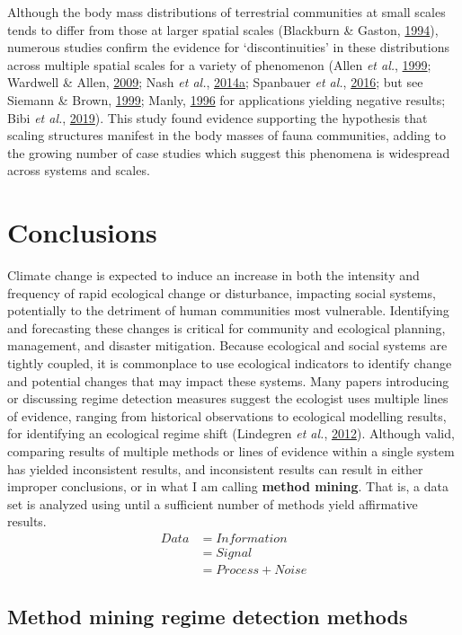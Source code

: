 \documentclass[12pt,twoside,openany]{reedthesis}
\begin{document}
Although the body mass distributions of terrestrial communities at small scales tends to differ from those at larger spatial scales (Blackburn \& Gaston, \protect\hyperlink{ref-blackburn1994animal}{1994}), numerous studies confirm the evidence for `discontinuities' in these distributions across multiple spatial scales for a variety of phenomenon (Allen \emph{et al.}, \protect\hyperlink{ref-allen1999body}{1999}; Wardwell \& Allen, \protect\hyperlink{ref-wardwell2009variability}{2009}; Nash \emph{et al.}, \protect\hyperlink{ref-nash2014discontinuities}{2014}\protect\hyperlink{ref-nash2014discontinuities}{a}; Spanbauer \emph{et al.}, \protect\hyperlink{ref-spanbauer2016body}{2016}; but see Siemann \& Brown, \protect\hyperlink{ref-siemann1999gaps}{1999}; Manly, \protect\hyperlink{ref-manly1996there}{1996} for applications yielding negative results; Bibi \emph{et al.}, \protect\hyperlink{ref-bibi2019body}{2019}). This study found evidence supporting the hypothesis that scaling structures manifest in the body masses of fauna communities, adding to the growing number of case studies which suggest this phenomena is widespread across systems and scales.

\hypertarget{conclusions}{%
\chapter{Conclusions}\label{conclusions}}

Climate change is expected to induce an increase in both the intensity and frequency of rapid ecological change or disturbance, impacting social systems, potentially to the detriment of human communities most vulnerable. Identifying and forecasting these changes is critical for community and ecological planning, management, and disaster mitigation. Because ecological and social systems are tightly coupled, it is commonplace to use ecological indicators to identify change and potential changes that may impact these systems. Many papers introducing or discussing regime detection measures suggest the ecologist uses multiple lines of evidence, ranging from historical observations to ecological modelling results, for identifying an ecological regime shift (Lindegren \emph{et al.}, \protect\hyperlink{ref-lindegren_early_2012}{2012}). Although valid, comparing results of multiple methods or lines of evidence within a single system has yielded inconsistent results, and inconsistent results can result in either improper conclusions, or in what I am calling \textbf{method mining}. That is, a data set is analyzed using until a sufficient number of methods yield affirmative results.
\begin{equation}
\begin{split}
Data  & = Information \\
& = Signal \\
& = Process + Noise
\end{split}
\label{eq:infoTheory}
\end{equation}
\hypertarget{method-mining-regime-detection-methods}{%
\section{Method mining regime detection methods}\label{method-mining-regime-detection-methods}}
\end{document}
